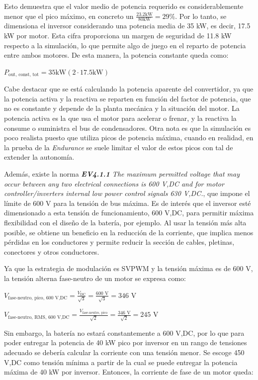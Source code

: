 Esto demuestra que el valor medio de potencia requerido es considerablemente menor que el pico máximo, en concreto un \(\frac{23.2 \text{kW}}{80 \text{kW}} = 29\%\). Por lo tanto, se dimensiona el inversor considerando una potencia media de 35 kW, es decir, 17.5 kW por motor. Esta cifra proporciona un margen de seguridad de 11.8 kW respecto a la simulación, lo que permite algo de juego en el reparto de potencia entre ambos motores. De esta manera, la potencia constante queda como:

\(P_{\text{out, const, tot}} = 35 \text{kW} (2 \cdot 17.5 \text{kW})\)

Cabe destacar que se está calculando la potencia aparente del convertidor, ya que la potencia activa y la reactiva se reparten en función del factor de potencia, que no es constante y depende de la planta mecánica y la situación del motor. La potencia activa es la que usa el motor para acelerar o frenar, y la reactiva la consume o suministra el bus de condensadores. Otra nota es que la simulación es poco realista puesto que utiliza picos de potencia máxima, cuando en realidad, en la prueba de la \textit{Endurance} se suele limitar el valor de estos picos con tal de extender la autonomía.

Además, existe la norma \textit{\textbf{EV4.1.1} The maximum permitted voltage that may occur between any two electrical connections is 600 V,DC and for motor controller/inverters internal low power control signals 630 V,DC.}, que impone el límite de 600 V para la tensión de bus máxima. Es de interés que el inversor esté dimensionado a esta tensión de funcionamiento, 600 V,DC, para permitir máxima flexibilidad con el diseño de la batería, por ejemplo. Al usar la tensión más alta posible, se obtiene un beneficio en la reducción de la corriente, que implica menos pérdidas en los conductores y permite reducir la sección de cables, pletinas, conectores y otros conductores.

Ya que la estrategia de modulación es SVPWM y la tensión máxima es de 600 V, la tensión alterna fase-neutro de un motor se expresa como:

\(V_{\text{fase-neutro, pico, 600 V,DC}} = \frac{V_{\text{DC}}}{\sqrt{3}} = \frac{600 \text{ V}}{\sqrt{3}} = 346 \text{ V}\)

\(V_{\text{fase-neutro, RMS, 600 V,DC}} = \frac{V_{\text{fase-neutro, pico}}}{\sqrt{2}} = \frac{346 \text{ V}}{\sqrt{2}} = 245 \text{ V}\)

Sin embargo, la batería no estará constantemente a 600 V,DC, por lo que para poder entregar la potencia de 40 kW pico por inversor en un rango de tensiones adecuado se debería calcular la corriente con una tensión menor. Se escoge 450 V,DC como tensión mínima a partir de la cual se puede entregar la potencia máxima de 40 kW por inversor. Entonces, la corriente de fase de un motor queda:

